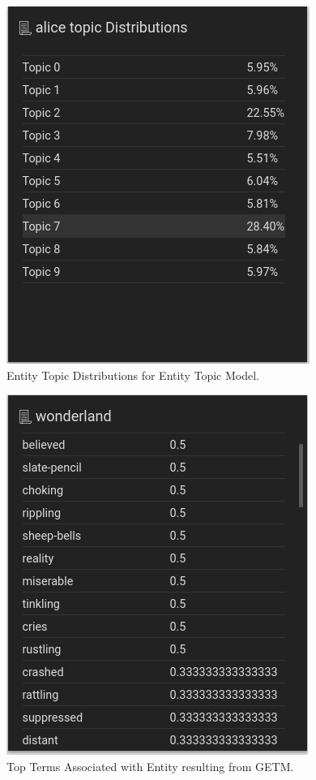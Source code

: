 \documentclass[10pt]{report}
\begin{document}
\begin{figure}[h]
  \centering
  \includegraphics[scale=0.5]{topic_dist_pct}
  \caption{Entity Topic Distributions for Entity Topic Model. \label{fig:entity_topic_pct}}
\end{figure}


\begin{figure}[h]
  \centering
  \includegraphics[scale=0.5]{entity_getm_top}
  \caption{Top Terms Associated with Entity resulting from GETM. \label{fig:entity_top_terms}}
\end{figure}
\end{document}
